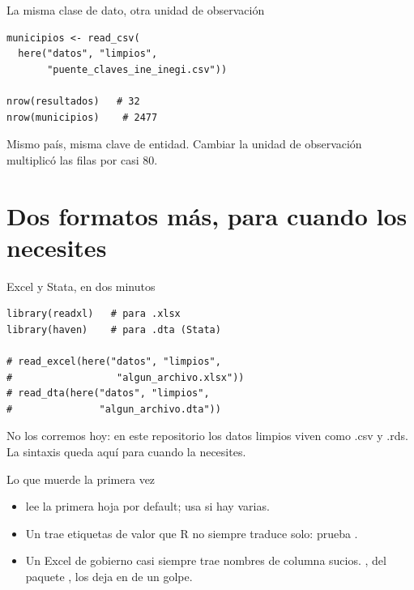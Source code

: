 \begin{frame}[fragile]{La misma clase de dato, otra unidad de observación}
\begin{lstlisting}
municipios <- read_csv(
  here("datos", "limpios",
       "puente_claves_ine_inegi.csv"))

nrow(resultados)   # 32
nrow(municipios)    # 2477
\end{lstlisting}

  \vspace{0.6em}
  Mismo país, misma clave de entidad. Cambiar la unidad de observación
  multiplicó las filas por casi 80.
\end{frame}

\section{Dos formatos más, para cuando los necesites}

\begin{frame}[fragile]{Excel y Stata, en dos minutos}
\begin{lstlisting}
library(readxl)   # para .xlsx
library(haven)    # para .dta (Stata)

# read_excel(here("datos", "limpios",
#                  "algun_archivo.xlsx"))
# read_dta(here("datos", "limpios",
#               "algun_archivo.dta"))
\end{lstlisting}

  \vspace{0.5em}
  {\small\color{grisTenue}No los corremos hoy: en este repositorio los
  datos limpios viven como .csv y .rds. La sintaxis queda aquí para
  cuando la necesites.}
\end{frame}

\begin{frame}{Lo que muerde la primera vez}
  \vspace{0.3em}
  \begin{itemize}\setlength{\itemsep}{0.9em}
    \item<1->  lee la primera hoja por default; usa
           si hay varias.
    \item<2-> Un  trae etiquetas de valor que R no siempre
          traduce solo: prueba .
    \item<3-> Un Excel de gobierno casi siempre trae nombres de columna
          sucios. , del paquete , los
          deja en  de un golpe.
  \end{itemize}
\end{frame}

